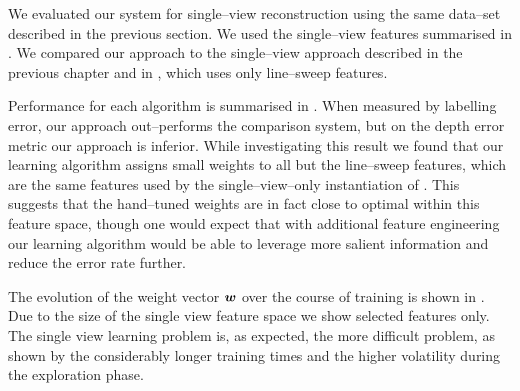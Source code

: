 We evaluated our system for single--view reconstruction using the same
data--set described in the previous section. We used the single--view
features summarised in . We compared our approach
to the single--view approach described in the previous chapter and in
\cite{Flint10eccv}, which uses only line--sweep features.

Performance for each algorithm is summarised in
. When measured by labelling error, our
approach out--performs the comparison system, but on the depth error
metric our approach is inferior. While investigating this result we
found that our learning algorithm assigns small weights to all but the
line--sweep features, which are the same features used by the
single--view--only instantiation of . This suggests
that the hand--tuned weights are in fact close to optimal within this
feature space, though one would expect that with additional feature
engineering our learning algorithm would be able to leverage more
salient information and reduce the error rate further.

The evolution of the weight vector $\Model$ over the course of
training is shown in . Due to the size of the
single view feature space we show selected features only. The
single view learning problem is, as expected, the more difficult
problem, as shown by the considerably longer training times and the
higher volatility during the exploration phase.

\newcommand{\ExtCompFrame}[3]{ \includegraphics[width=0.18\textwidth]
  {extra_comparison_frames/#1_frame#2_#3.jpg} }

\newcommand{\MviewRow}[2]{
  \ExtCompFrame{#1}{#2}{mview_depth} &
  \ExtCompFrame{#1}{#2}{mview_lbl} &
  \ExtCompFrame{#1}{#2}{iccv} &
  \ExtCompFrame{#1}{#2}{gt}
}

\newcommand{\SviewRow}[2]{
  \ExtCompFrame{#1}{#2}{sview_depth} &
  \ExtCompFrame{#1}{#2}{sview_lbl} &
  \ExtCompFrame{#1}{#2}{eccv} &
  \ExtCompFrame{#1}{#2}{gt}
}


